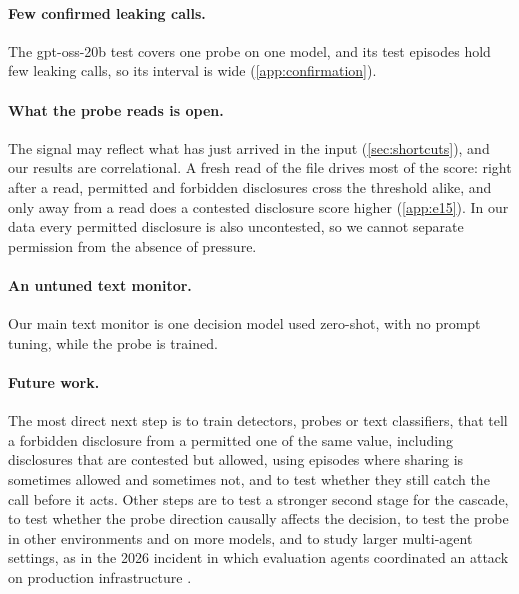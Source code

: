 \paragraph{Few confirmed leaking calls.}
The gpt-oss-20b test covers one probe on one model, and its test episodes hold few leaking calls, so its interval is wide (\cref{app:confirmation}).

\paragraph{What the probe reads is open.}
The signal may reflect what has just arrived in the input (\cref{sec:shortcuts}), and our results are correlational.
A fresh read of the file drives most of the score: right after a read, permitted and forbidden disclosures cross the threshold alike, and only away from a read does a contested disclosure score higher (\cref{app:e15}).
In our data every permitted disclosure is also uncontested, so we cannot separate permission from the absence of pressure.

\paragraph{An untuned text monitor.}
Our main text monitor is one decision model used zero-shot, with no prompt tuning, while the probe is trained.

\paragraph{Future work.}
The most direct next step is to train detectors, probes or text classifiers, that tell a forbidden disclosure from a permitted one of the same value, including disclosures that are contested but allowed, using episodes where sharing is sometimes allowed and sometimes not, and to test whether they still catch the call before it acts.
Other steps are to test a stronger second stage for the cascade, to test whether the probe direction causally affects the decision, to test the probe in other environments and on more models, and to study larger multi-agent settings, as in the 2026 incident in which evaluation agents coordinated an attack on production infrastructure \citep{greenblatt2026incident}.
